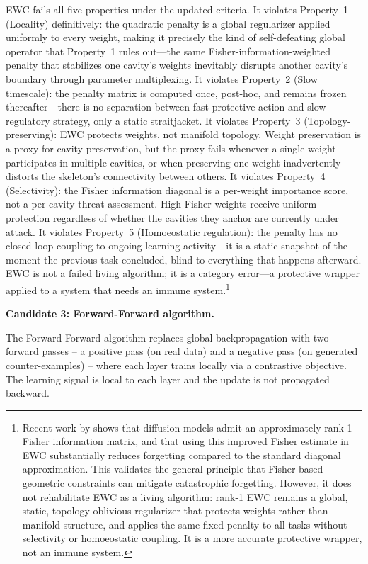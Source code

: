 \documentclass{article}
\begin{document}
EWC fails all five properties under the updated criteria. It violates Property~1 (Locality) definitively: the quadratic penalty is a global regularizer applied uniformly to every weight, making it precisely the kind of self-defeating global operator that Property~1 rules out---the same Fisher-information-weighted penalty that stabilizes one cavity's weights inevitably disrupts another cavity's boundary through parameter multiplexing. It violates Property~2 (Slow timescale): the penalty matrix is computed once, post-hoc, and remains frozen thereafter---there is no separation between fast protective action and slow regulatory strategy, only a static straitjacket. It violates Property~3 (Topology-preserving): EWC protects weights, not manifold topology. Weight preservation is a proxy for cavity preservation, but the proxy fails whenever a single weight participates in multiple cavities, or when preserving one weight inadvertently distorts the skeleton's connectivity between others. It violates Property~4 (Selectivity): the Fisher information diagonal is a per-weight importance score, not a per-cavity threat assessment. High-Fisher weights receive uniform protection regardless of whether the cavities they anchor are currently under attack. It violates Property~5 (Homoeostatic regulation): the penalty has no closed-loop coupling to ongoing learning activity---it is a static snapshot of the moment the previous task concluded, blind to everything that happens afterward. EWC is not a failed living algorithm; it is a category error---a protective wrapper applied to a system that needs an immune system.\footnote{Recent work by \citet{Wang2025rank1fisher} shows that diffusion models admit an approximately rank-1 Fisher information matrix, and that using this improved Fisher estimate in EWC substantially reduces forgetting compared to the standard diagonal approximation. This validates the general principle that Fisher-based geometric constraints can mitigate catastrophic forgetting. However, it does not rehabilitate EWC as a living algorithm: rank-1 EWC remains a global, static, topology-oblivious regularizer that protects weights rather than manifold structure, and applies the same fixed penalty to all tasks without selectivity or homoeostatic coupling. It is a more accurate protective wrapper, not an immune system.}

\medskip
\noindent\textbf{Candidate 3: Forward-Forward algorithm.}

The Forward-Forward algorithm \citep{Hinton2022forwardforward} replaces global backpropagation with two forward passes -- a positive pass (on real data) and a negative pass (on generated counter-examples) -- where each layer trains locally via a contrastive objective. The learning signal is local to each layer and the update is not propagated backward.
\end{document}
